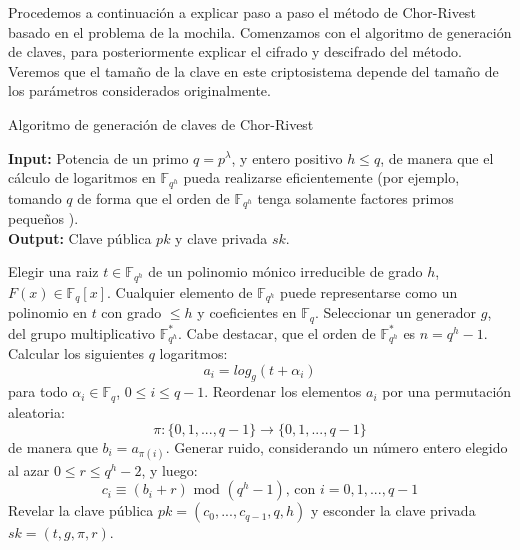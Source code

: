     Procedemos a continuación a explicar paso a paso el método de Chor-Rivest basado en el problema de la mochila. Comenzamos con el algoritmo de generación de claves, para posteriormente explicar el cifrado y descifrado del método. Veremos que el tamaño de la clave en este criptosistema depende del tamaño de los parámetros considerados originalmente.

    \begin{algorithm}[H]
        \caption{Algoritmo de generación de claves de Chor-Rivest}
        \textbf{Input:} Potencia de un primo $q = p^{\lambda}$, y entero positivo $h \leq q$, de manera que el cálculo de logaritmos en $\mathbb{F}_{q^{h}}$ pueda realizarse eficientemente (por ejemplo, tomando $q$ de forma que el orden de $\mathbb{F}_{q^{h}}$ tenga solamente factores primos pequeños \cite{artPohligHellman}). \\
        \textbf{Output:} Clave pública $pk$ y clave privada $sk$.
        \bigskip
        \begin{algorithmic}[1] 
            \State Elegir una raiz $t \in \mathbb{F}_{q^{h}}$ de un polinomio mónico irreducible de grado $h$, $F(x) \in \mathbb{F}_{q}[x]$. Cualquier elemento de $\mathbb{F}_{q^{h}}$ puede representarse como un polinomio en $t$ con grado $\leq h$ y coeficientes en $\mathbb{F}_{q}$.
            \State Seleccionar un generador $g$, del grupo multiplicativo $\mathbb{F}^{*}_{q^{h}}$. Cabe destacar, que el orden de $\mathbb{F}^{*}_{q^{h}}$ es $n = q^{h} - 1$.
            \State Calcular los siguientes $q$ logaritmos:
            \begin{equation}
                a_{i} = log_{g} (t + \alpha_{i})
            \end{equation}
            para todo $\alpha_{i} \in \mathbb{F}_{q}$, $0 \leq i \leq q - 1$.
            \State Reordenar los elementos $a_{i}$ por una permutación aleatoria:
            \begin{equation}
                \pi : \{0, 1, ... , q-1\} \rightarrow \{0, 1, ... , q-1\}
            \end{equation}
            de manera que $b_{i} = a_{\pi(i)}$.
            \State Generar ruido, considerando un número entero elegido al azar $0 \leq r \leq q^{h} - 2$, y luego:
            \begin{equation}
                c_{i} \equiv (b_{i} + r) \text{ mod } (q^{h} - 1) \text{, con } i = 0, 1, ... , q - 1 
            \end{equation}
            \State Revelar la clave pública $pk = (c_{0}, ... , c_{q-1}, q, h)$ y esconder la clave privada $sk = (t, g, \pi, r)$.
        \end{algorithmic}
    \end{algorithm}
    
